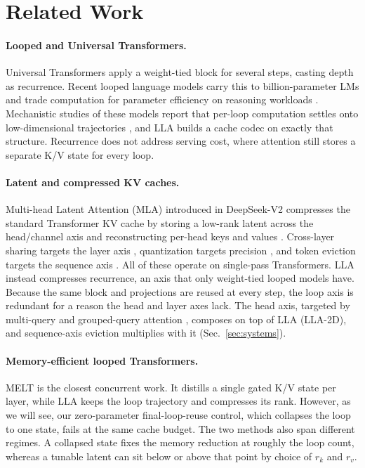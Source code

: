 \documentclass[10pt]{article}
\newcommand{\lla}{LLA}
\begin{document}
\section{Related Work}
\label{sec:related}
\paragraph{Looped and Universal Transformers.}
Universal Transformers \citep{dehghani2019universal} apply a weight-tied block for several steps, casting depth as recurrence. Recent looped language models carry this to billion-parameter LMs and trade computation for parameter efficiency on reasoning workloads \citep{ouro2024}. Mechanistic studies of these models report that per-loop computation settles onto low-dimensional trajectories \citep{blayney2026mechanisticanalysisloopedreasoning}, and \lla{} builds a cache codec on exactly that structure. Recurrence does not address serving cost, where attention still stores a separate K/V state for every loop.

\paragraph{Latent and compressed KV caches.}
Multi-head Latent Attention (MLA) introduced in DeepSeek-V2 compresses the standard Transformer KV cache by storing a low-rank latent across the head/channel axis and reconstructing per-head keys and values \citep{deepseekv2}. Cross-layer sharing targets the layer axis \citep{cla2024,yoco2024,minicache2024}, quantization targets precision \citep{kvquant2024}, and token eviction targets the sequence axis \citep{h2o2023,streamingllm2024}. All of these operate on single-pass Transformers. \lla{} instead compresses recurrence, an axis that only weight-tied looped models have. Because the same block and projections are reused at every step, the loop axis is redundant for a reason the head and layer axes lack. The head axis, targeted by multi-query and grouped-query attention \citep{mqa2019,gqa2023}, composes on top of \lla{} (\lla{}-2D), and sequence-axis eviction multiplies with it (Sec.~\ref{sec:systems}).

\paragraph{Memory-efficient looped Transformers.}
MELT \citep{vendrell2026melt} is the closest concurrent work. It distills a single gated K/V state per layer, while \lla{} keeps the loop trajectory and compresses its rank. However, as we will see, our zero-parameter final-loop-reuse control, which collapses the loop to one state, fails at the same cache budget. The two methods also span different regimes. A collapsed state fixes the memory reduction at roughly the loop count, whereas a tunable latent can sit below or above that point by choice of $r_k$ and $r_v$.
\end{document}
